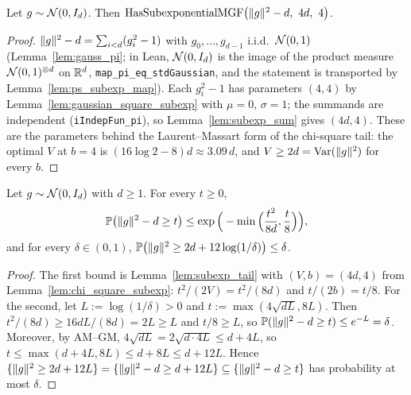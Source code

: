 \begin{lemma}\label{lem:chi_square_subexp}
\leanok
{}
Let $g \sim \mathcal{N}(0, I_d)$. Then
$\mathrm{HasSubexponentialMGF}\big(\norm{g}^2 - d,\ 4d,\ 4\big)$.
\end{lemma}

\begin{proof}
\leanok
{}
$\lVert g \rVert^2 - d = \sum_{i<d}(g_i^2 - 1)$ with $g_0,\dots,g_{d-1}$ i.i.d.\ $\mathcal{N}(0,1)$
(Lemma~\ref{lem:gauss_pi}; in Lean, $\mathcal{N}(0,I_d)$ is the image of the product measure
$\mathcal{N}(0,1)^{\otimes d}$ on $\mathbb{R}^d$, \texttt{map\_pi\_eq\_stdGaussian}, and the statement is
transported by Lemma~\ref{lem:ps_subexp_map}). Each $g_i^2 - 1$ has parameters $(4, 4)$ by
Lemma~\ref{lem:gaussian_square_subexp} with $\mu = 0$, $\sigma = 1$; the summands are
independent (\texttt{iIndepFun\_pi}), so Lemma~\ref{lem:subexp_sum} gives $(4d, 4)$. These are the
parameters behind the Laurent--Massart form of the chi-square tail: the optimal $V$ at $b = 4$ is
$(16\log2-8)d \approx 3.09\,d$, and $V \ge 2d = \mathrm{Var}(\lVert g \rVert^2)$ for every $b$.
\end{proof}

\begin{lemma}\label{lem:chi_square_tail}
\leanok
{}
Let $g \sim \mathcal{N}(0,I_d)$ with $d \ge 1$. For every $t \ge 0$,
\[
  \mathbb{P}\big(\lVert g \rVert^2 - d \ge t\big) \le \exp\Big(-\min\Big(\frac{t^2}{8d}, \frac{t}{8}\Big)\Big),
\]
and for every $\delta \in (0,1)$,
$\mathbb{P}\big(\lVert g \rVert^2 \ge 2d + 12\log(1/\delta)\big) \le \delta$.
\end{lemma}

\begin{proof}
\leanok
{}
The first bound is Lemma~\ref{lem:subexp_tail} with $(V,b) = (4d,4)$ from
Lemma~\ref{lem:chi_square_subexp}: $t^2/(2V) = t^2/(8d)$ and $t/(2b) = t/8$. For the second,
let $L := \log(1/\delta) > 0$ and $t := \max(4\sqrt{dL}, 8L)$. Then $t^2/(8d) \ge 16dL/(8d) = 2L \ge L$
and $t/8 \ge L$, so $\mathbb{P}(\lVert g \rVert^2 - d \ge t) \le e^{-L} = \delta$. Moreover, by AM--GM,
$4\sqrt{dL} = 2\sqrt{d\cdot4L} \le d + 4L$, so $t \le \max(d + 4L, 8L) \le d + 8L \le d + 12L$.
Hence $\{\lVert g \rVert^2 \ge 2d + 12L\} = \{\lVert g \rVert^2 - d \ge d + 12L\} \subseteq \{\lVert g \rVert^2 - d \ge t\}$
has probability at most $\delta$.
\end{proof}


